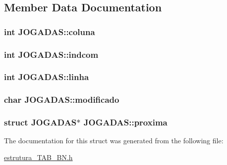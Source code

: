 \subsection{Member Data Documentation}
\hypertarget{structJOGADAS_a28827d11a796524d7c3f836a34a9b28c}{
\subsubsection[{coluna}]{\setlength{\rightskip}{0pt plus 5cm}int J\-O\-G\-A\-D\-A\-S\-::coluna}}\label{structJOGADAS_a28827d11a796524d7c3f836a34a9b28c}
\hypertarget{structJOGADAS_a206a51faab310b88ead47ae8bd45c005}{
\subsubsection[{indcom}]{\setlength{\rightskip}{0pt plus 5cm}int J\-O\-G\-A\-D\-A\-S\-::indcom}}\label{structJOGADAS_a206a51faab310b88ead47ae8bd45c005}
\hypertarget{structJOGADAS_a967eba2150e21971402055c08864f81e}{
\subsubsection[{linha}]{\setlength{\rightskip}{0pt plus 5cm}int J\-O\-G\-A\-D\-A\-S\-::linha}}\label{structJOGADAS_a967eba2150e21971402055c08864f81e}
\hypertarget{structJOGADAS_a66f982d3f9fb083c8289819db4e1f892}{
\subsubsection[{modificado}]{\setlength{\rightskip}{0pt plus 5cm}char J\-O\-G\-A\-D\-A\-S\-::modificado}}\label{structJOGADAS_a66f982d3f9fb083c8289819db4e1f892}
\hypertarget{structJOGADAS_a5e94fadbce9d65532b484d6d36bbce7d}{
\subsubsection[{proxima}]{\setlength{\rightskip}{0pt plus 5cm}struct {\bf J\-O\-G\-A\-D\-A\-S}$\ast$ J\-O\-G\-A\-D\-A\-S\-::proxima}}\label{structJOGADAS_a5e94fadbce9d65532b484d6d36bbce7d}


The documentation for this struct was generated from the following file\-:\begin{DoxyCompactItemize}
\item 
\hyperlink{estrutura__TAB__BN_8h}{estrutura\-\_\-\-T\-A\-B\-\_\-\-B\-N.\-h}\end{DoxyCompactItemize}
